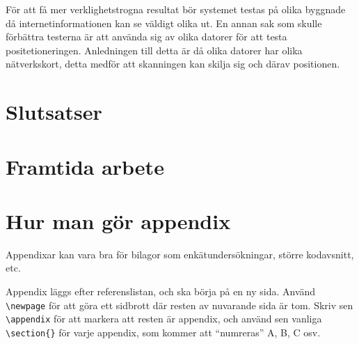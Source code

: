 \documentclass[swedish, a4paper,12pt]{article}
\begin{document}
För att få mer verklighetstrogna resultat bör systemet testas på olika byggnade då internetinformationen kan se väldigt olika ut. En annan sak som skulle förbättra testerna är att använda sig av olika datorer för att testa positetioneringen. Anledningen till detta är då olika datorer har olika nätverkskort, detta medför att skanningen kan skilja sig och därav positionen.

\section{Slutsatser}

\section{Framtida arbete}

\newpage

%



\newpage
\appendix %
\iffalse \section{Hur man gör appendix}
Appendixar kan vara bra för bilagor som enkätundersökningar, större kodavsnitt, etc.

Appendix läggs efter referenslistan, och ska börja på en ny sida. Använd \verb|\newpage| för att göra ett sidbrott där resten av nuvarande sida är tom. Skriv sen \verb|\appendix| för att markera att resten är appendix, och
 använd sen vanliga \verb|\section{}| för varje appendix, som kommer att ``numreras'' A, B, C osv.
\end{document}
